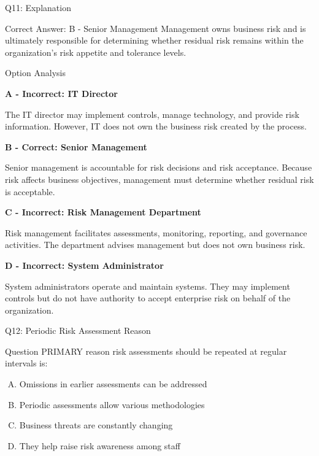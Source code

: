 \documentclass{beamer}
\begin{document}
	\begin{frame}[shrink=10]{Q11: Explanation}
		\footnotesize
		
		\begin{block}{Correct Answer: B - Senior Management}
			Management owns business risk and is ultimately responsible
			for determining whether residual risk remains within the
			organization's risk appetite and tolerance levels.
		\end{block}
		
		\begin{block}{Option Analysis}
			
			\textbf{A - Incorrect: IT Director}
			
			The IT director may implement controls, manage technology,
			and provide risk information. However, IT does not own the
			business risk created by the process.
			
			\vspace{0.15cm}
			
			\textbf{B - Correct: Senior Management}
			
			Senior management is accountable for risk decisions and risk
			acceptance. Because risk affects business objectives,
			management must determine whether residual risk is acceptable.
			
			\vspace{0.15cm}
			
			\textbf{C - Incorrect: Risk Management Department}
			
			Risk management facilitates assessments, monitoring,
			reporting, and governance activities. The department advises
			management but does not own business risk.
			
			\vspace{0.15cm}
			
			\textbf{D - Incorrect: System Administrator}
			
			System administrators operate and maintain systems. They may
			implement controls but do not have authority to accept
			enterprise risk on behalf of the organization.
			
		\end{block}
		

		
	\end{frame}
	
	\begin{frame}{Q12: Periodic Risk Assessment Reason}
		\begin{block}{Question}
			PRIMARY reason risk assessments should be repeated at regular intervals is:
		\end{block}
		\begin{enumerate}[(A)]
			\item Omissions in earlier assessments can be addressed
			\item Periodic assessments allow various methodologies
			\item Business threats are constantly changing
			\item They help raise risk awareness among staff
		\end{enumerate}
	\end{frame}
	
\end{document}
